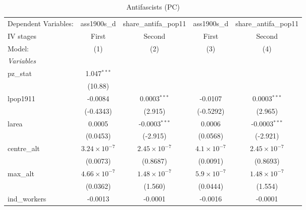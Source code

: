 
\begin{table}[htbp]
   \caption{Antifascists (PC)}
   \centering
   \begin{tabular}{lcccc}
      \tabularnewline \midrule \midrule
      Dependent Variables:             & ass1900s\_d           & share\_antifa\_pop11   & ass1900s\_d          & share\_antifa\_pop11\\    
      IV stages                        & First                 & Second                 & First                & Second \\   
      Model:                           & (1)                   & (2)                    & (3)                  & (4)\\  
      \midrule
      \emph{Variables}\\
      pz\_stat                         & 1.047$^{***}$         &                        &                      &   \\   
                                       & (10.88)               &                        &                      &   \\   
      lpop1911                         & -0.0084               & 0.0003$^{***}$         & -0.0107              & 0.0003$^{***}$\\   
                                       & (-0.4343)             & (2.915)                & (-0.5292)            & (2.965)\\   
      larea                            & 0.0005                & -0.0003$^{***}$        & 0.0006               & -0.0003$^{***}$\\   
                                       & (0.0453)              & (-2.915)               & (0.0568)             & (-2.921)\\   
      centre\_alt                      & $3.24\times 10^{-7}$  & $2.45\times 10^{-7}$   & $4.1\times 10^{-7}$  & $2.45\times 10^{-7}$\\    
                                       & (0.0073)              & (0.8687)               & (0.0091)             & (0.8693)\\   
      max\_alt                         & $4.66\times 10^{-7}$  & $1.48\times 10^{-7}$   & $5.9\times 10^{-7}$  & $1.48\times 10^{-7}$\\    
                                       & (0.0362)              & (1.560)                & (0.0444)             & (1.554)\\   
      ind\_workers                     & -0.0013               & -0.0001                & -0.0016              & -0.0001\\   

\end{tabular}
\end{table}
